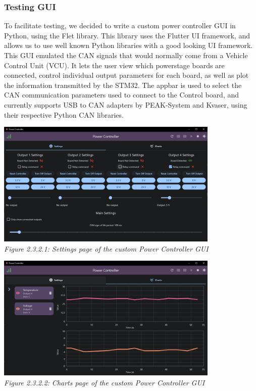 \subsubsection{Testing GUI}
To facilitate testing, we decided to write a custom power controller GUI in Python, using the Flet library.
This library uses the Flutter UI framework, and allows us to use well known Python libraries with a good looking UI framework.
This GUI emulated the CAN signals that would normally come from a Vehicle Control Unit (VCU).
It lets the user view which powerstage boards are connected, control individual output parameters for each board, as well as plot the information transmitted by the STM32.
The appbar is used to select the CAN communication parameters used to connect to the Control board, and currently supports USB to CAN adapters by PEAK-System and Kvaser, using their respective Python CAN libraries.

\begin{center}
    \includegraphics[width=0.8\textwidth]{images/gui_settings_page.png}\\
    \it Figure 2.3.2.1: Settings page of the custom Power Controller GUI\\
    \vspace{\baselineskip}

    \includegraphics[width=0.8\textwidth]{images/gui_charts_page.png}\\
    \it Figure 2.3.2.2: Charts page of the custom Power Controller GUI\\
\end{center}
